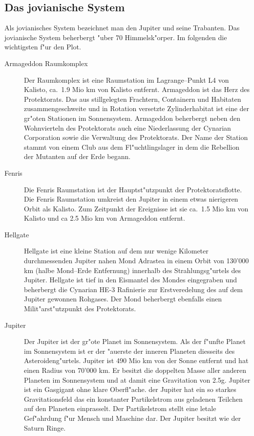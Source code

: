 \begin{appendices}
\section{Das jovianische System}

Als jovianisches System bezeichnet man den Jupiter und seine Trabanten. Das jovianische System beherbergt "uber 70  Himmelsk"orper. Im folgenden die wichtigsten f"ur den Plot.

\begin{description}
\item [Armageddon Raumkomplex] Der Raumkomplex ist eine Raumstation im Lagrange--Punkt L4 von Kalisto, ca.~1.9 Mio km von Kalisto entfernt.
      Armageddon ist das Herz des Protektorats. Das aus stillgelegten Frachtern, Containern und Habitaten zusammengeschwei\3te und in Rotation versetzte Zylinderhabitat ist eine der gr"o\3ten Stationen im Sonnensystem. Armageddon beherbergt neben den Wohnvierteln des Protektorats auch eine Niederlassung der Cynarian Corporation sowie die Verwaltung des Protektorats. Der Name der Station stammt von einem Club aus dem Fl"uchtlingslager in dem die Rebellion der Mutanten auf der Erde begann.
\item [Fenris] Die Fenris Raumstation ist der Hauptst"utzpunkt der Protektoratsflotte. Die Fenris Raumstation umkreist
      den Jupiter in einem etwas nierigeren Orbit als Kalisto. Zum Zeitpunkt der Ereignisse ist sie ca.~1.5 Mio km von Kalisto und ca 2.5 Mio km von Armageddon entfernt.
\item [Hellgate] Hellgate ist eine kleine Station auf dem nur wenige Kilometer durchmessenden Jupiter nahen Mond
      Adrastea in einem Orbit von 130'000 km (halbe Mond--Erde Entfernung) innerhalb des Strahlungsg"urtels des Jupiter. Hellgate ist tief in den Eismantel des Mondes eingegraben und beherbergt die Cynarian HE-3 Rafinierie zur Erstveredelung des auf dem Jupiter gewonnen Rohgases. Der Mond beherbergt ebenfalls einen Milit"arst"utzpunkt des Protektorats.
\item [Jupiter] Der Jupiter ist der gr"o\3te Planet im Sonnensystem. Als der f"unfte Planet im Sonnensystem ist er der
      "au\3erste der inneren Planeten diesseits des Asteroideng"urtels. Jupiter ist 490 Mio km von der Sonne entfernt und hat einen Radius von 70'000 km. Er besitzt die doppelten Masse aller anderen Planeten im Sonnensystem und at damit eine Gravitation von 2.5g. Jupiter ist ein Gasgigant ohne klare Oberfl"ache. der Jupiter hat ein so starkes Gravitationsfeld das ein konstanter Partikelstrom aus geladenen Teilchen auf den Planeten einprasselt. Der Partikelstrom stellt eine letale Gef"ahrdung f"ur Mensch und Maschine dar. Der Jupiter besitzt wie der Saturn Ringe.

\end{description}
\end{appendices}
